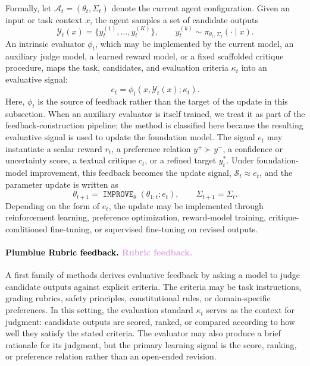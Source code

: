 \documentclass{article}
\newcommand{\IMPROVE}{\operatorname{\mathtt{IMPROVE}}}
\let\oldtextcolor\textcolor
\renewcommand{\textcolor}[2]{
  \def\temp{#1}
  \def\red{blue}
  \ifx\temp\red
    \oldtextcolor{black}{#2}
  \else
    \oldtextcolor{#1}{#2}
  \fi
}
\begin{document}
Formally, let $\mathcal{A}_t=(\theta_t,\Sigma_t)$ denote the current agent configuration. Given an input or task context $x$, the agent samples a set of candidate outputs
\begin{equation}
\mathcal{Y}_t(x)=\{y_t^{(1)},\ldots,y_t^{(K)}\}, \qquad 
y_t^{(k)} \sim \pi_{\theta_t,\Sigma_t}(\cdot \mid x).
\end{equation}
An intrinsic evaluator $\phi_t$, which may be implemented by the current model, an auxiliary judge model, a learned reward model, or a fixed scaffolded critique procedure, maps the task, candidates, and evaluation criteria $\kappa_t$ into an evaluative signal:
\begin{equation}
e_t=\phi_t(x,\mathcal{Y}_t(x);\kappa_t).
\end{equation}
Here, $\phi_t$ is the source of feedback rather than the target of the update in this subsection. When an auxiliary evaluator is itself trained, we treat it as part of the feedback-construction pipeline; the method is classified here because the resulting evaluative signal is used to update the foundation model. The signal $e_t$ may instantiate a scalar reward $r_t$, a preference relation $y^+\succ y^-$, a confidence or uncertainty score, a textual critique $c_t$, or a refined target $y_t^\ast$. Under foundation-model improvement, this feedback becomes the update signal, $\mathcal{S}_t\approx e_t$, and the parameter update is written as
\begin{equation}
\theta_{t+1}=\IMPROVE_{\theta}(\theta_{1:t};e_t), \qquad \Sigma_{t+1}=\Sigma_t.
\end{equation}
Depending on the form of $e_t$, the update may be implemented through reinforcement learning, preference optimization, reward-model training, critique-conditioned fine-tuning, or supervised fine-tuning on revised outputs.

\paragraph{\textcolor{Plum}{Rubric feedback.}}
A first family of methods derives evaluative feedback by asking a model to judge candidate outputs against explicit criteria. The criteria may be task instructions, grading rubrics, safety principles, constitutional rules, or domain-specific preferences. In this setting, the evaluation standard $\kappa_t$ serves as the context for judgment: candidate outputs are scored, ranked, or compared according to how well they satisfy the stated criteria. The evaluator may also produce a brief rationale for its judgment, but the primary learning signal is the score, ranking, or preference relation rather than an open-ended revision.
\end{document}
